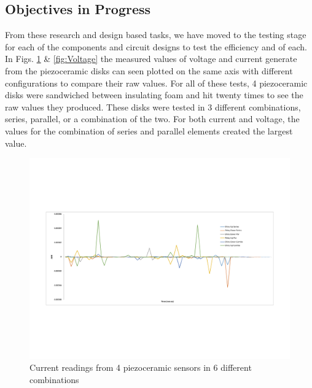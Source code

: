 \documentclass[letterpaper, 12 pt, onecolumn, hidelinks]{ieeetran}
\begin{document}
\subsection{Objectives in Progress}\label{sec:inProgress}
From these research and design based tasks, we have moved to the testing stage for each of the components and circuit designs to test the efficiency and of each. In Figs. \ref{fig:Current} \& \ref{fig:Voltage} the measured values of voltage and current generate from the piezoceramic disks can seen plotted on the same axis with different configurations to compare their raw values. For all of these tests, 4 piezoceramic disks were sandwiched between insulating foam and hit twenty times to see the raw values they produced. These disks were tested in 3 different combinations, series, parallel, or a combination of the two. For both current and voltage, the values for the combination of series and parallel elements created the largest value. 

\begin{figure}[h]
	\begin{center}
		\includegraphics[trim=55 200 75 165, clip, width=\columnwidth]{Current.pdf}
	\end{center}
	\vspace{-1em}
	\caption{\label{fig:Current}Current readings from 4 piezoceramic sensors in 6 different combinations}
\end{figure}
\end{document}
